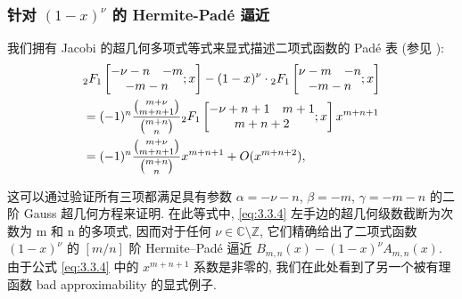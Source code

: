 \subsubsection{针对 \((1-x)^{\nu}\) 的 Hermite-Pad{\'e} 逼近}\label{sec:3.3.3}

我们拥有 Jacobi \cite{Jac1859} 的超几何多项式等式来显式描述二项式函数的 Pad{\'e} 表 (参见 \cite[page 75]{Zan14}):
\begin{equation}\label{eq:3.3.4}
    \begin{aligned}
    & {}_{2}F_{1} \left[ \begin{matrix} -\nu-n & -m \\ \multicolumn{2}{c}{-m-n} \end{matrix} ; x \right] - (1-x)^{\nu} \cdot {}_{2}F_{1} \left[ \begin{matrix} \nu-m & -n \\ \multicolumn{2}{c}{-m-n} \end{matrix} ; x \right] \\
    &= (-1)^n \frac{\binom{m+\nu}{m+n+1}}{\binom{m+n}{n}} {}_{2}F_{1} \left[ \begin{matrix} -\nu+n+1 & m+1 \\ \multicolumn{2}{c}{m+n+2} \end{matrix} ; x \right] x^{m+n+1} \\
    &= (-1)^n \frac{\binom{m+\nu}{m+n+1}}{\binom{m+n}{n}} x^{m+n+1} + O(x^{m+n+2}),
\end{aligned}
\end{equation}

这可以通过验证所有三项都满足具有参数 \(\alpha = -\nu - n\), \(\beta = -m\), \(\gamma = -m - n\) 的二阶 Gauss 超几何方程来证明. 
在此等式中, \eqref{eq:3.3.4} 左手边的超几何级数截断为次数为 m 和 n 的多项式, 
因而对于任何 \(\nu \in \mathbb{C} \setminus \mathbb{Z}\), 它们精确给出了二项式函数 \((1-x)^{\nu}\) 的 \([m/n]\) 阶 Hermite--Pad{\'e} 逼近 \(B_{m,n}(x) - (1-x)^{\nu}A_{m,n}(x)\). 
由于公式 \eqref{eq:3.3.4} 中的 \(x^{m+n+1}\) 系数是非零的, 我们在此处看到了另一个被有理函数 bad approximability 的显式例子.

